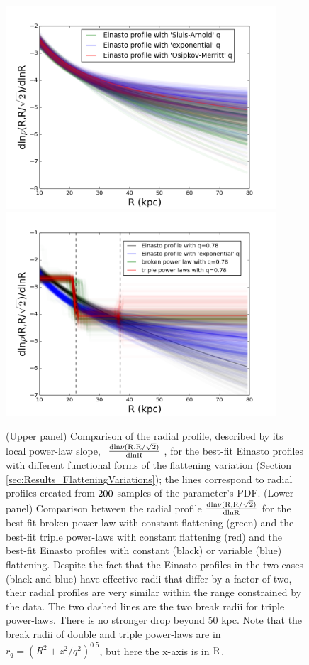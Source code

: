 \documentclass[12pt,preprint]{aastex}
\begin{document}
\begin{figure}[htbp]
\centering
\includegraphics[width=0.9\textwidth,height=0.45\textheight]{density_45d_compareqv}
\includegraphics[width=0.9\textwidth,height=0.45\textheight]{density_45d_mcmc}
\caption{(Upper panel) Comparison of the radial profile, described by its local power-law slope, $~\rm \frac{dln\nu(R,R/\sqrt{2})}{dlnR}~$, for the best-fit Einasto profiles with different functional forms of the flattening variation (Section  \ref{sec:Results_FlatteningVariations}); the lines correspond to radial profiles created from $\rm 200$ samples of the parameter's PDF. (Lower panel) Comparison between the radial profile $\rm \frac{dln\nu(R,R/\sqrt{2})}{dlnR}$ for the best-fit broken power-law with constant flattening (green) and the best-fit triple power-laws with constant flattening (red) and the best-fit Einasto profiles with constant (black) or variable (blue) flattening. Despite the fact that the Einasto profiles in the two cases (black and blue) have effective radii that differ by a factor of two, their radial profiles are very similar within the range constrained by the data. The two dashed lines are the two break radii for triple power-laws. There is no stronger drop beyond 50 kpc. Note that the break radii of double and triple power-laws are in $r_q=(R^2+z^2/q^2)^{0.5}$, but here the x-axis is in $\rm R$.}
\label{f:fdensity}
\end{figure}
\end{document}
